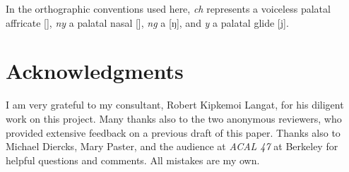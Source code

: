 \documentclass[output=paper]{LSP/langsci}
\begin{document}
\medskip

\noindent
 In the orthographic conventions used here, \textit{ch} represents a voiceless palatal affricate [\textteshlig], \textit{ny} a palatal nasal [\textltailn], \textit{ng} a  [ŋ], and \textit{y} a palatal glide [j].   

\section*{Acknowledgments}
I am very grateful to my  consultant, Robert Kipkemoi Langat, for his diligent work on this project. Many thanks also to the two anonymous reviewers, who provided extensive feedback on a previous draft of this paper. Thanks also to Michael Diercks, Mary Paster, and the audience at \textit{ACAL 47} at Berkeley for helpful questions and comments. All mistakes are my own.

\sloppy
\printbibliography[heading=subbibliography,notkeyword=this]
\end{document}
